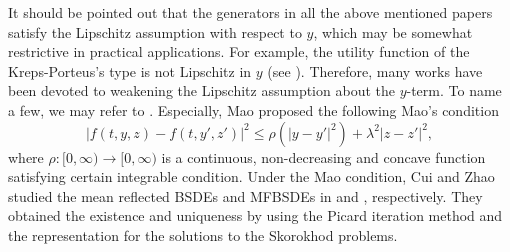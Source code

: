 \documentclass[10pt]{article}%
\numberwithin{equation}{section}
\def \E{\mathbf{E}}
\begin{document}
It should be pointed out that the generators in all the above mentioned papers satisfy the Lipschitz assumption with respect to $y$, which may be somewhat restrictive in practical applications. For example, the utility function of the Kreps-Porteus’s type is not Lipschitz in $y$ (see \cite{DE}). %
Therefore, many works have been devoted to weakening the Lipschitz assumption about the $y$-term. To name a few, we may refer to \cite{BJ,FJ,M}. Especially, Mao \cite{M} proposed the following Mao's condition%
$$\left|f(t,y,z)-f(t,y',z')\right|^2\leq \rho(\left|y-y'\right|^2)+\lambda^2\left|z-z'\right|^2,$$%
where $\rho:[0,\infty)\rightarrow [0,\infty)$ is a continuous, non-decreasing and concave function satisfying certain integrable condition. %
Under the Mao condition, Cui and Zhao  studied the mean reflected BSDEs and MFBSDEs  in \cite{CZ} and \cite{CZ1}, respectively. They obtained the existence and uniqueness by using the Picard iteration method and the representation for the solutions to the Skorokhod problems.  %
\end{document}
